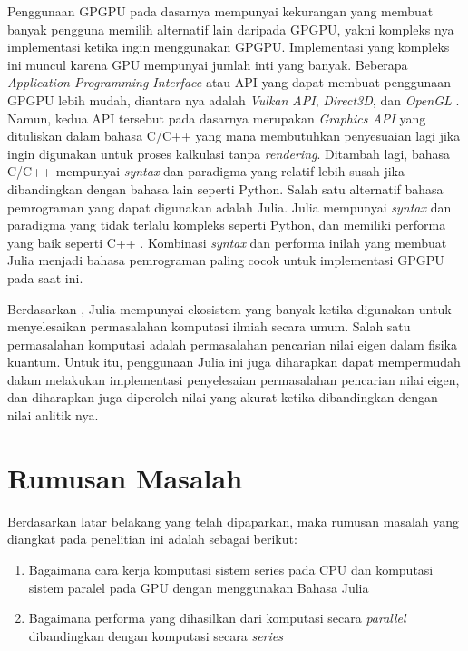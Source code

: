 
Penggunaan GPGPU pada dasarnya mempunyai kekurangan yang membuat banyak
pengguna memilih alternatif lain daripada GPGPU, yakni kompleks nya
implementasi ketika ingin menggunakan GPGPU. Implementasi yang kompleks ini
muncul karena GPU mempunyai jumlah inti yang banyak. Beberapa \emph{Application
	Programming Interface} atau API \citep{evansonExplainerWhatAPI2021} yang dapat
membuat penggunaan GPGPU lebih mudah, diantara nya adalah \emph{Vulkan API},
\emph{Direct3D}, dan \emph{OpenGL}
\citep{khairySurveyArchitecturalApproaches2019}. Namun, kedua API tersebut pada
dasarnya merupakan \emph{Graphics API} yang dituliskan dalam bahasa C/C++ yang
mana membutuhkan penyesuaian lagi jika ingin digunakan untuk proses kalkulasi
tanpa \emph{rendering}. Ditambah lagi, bahasa C/C++ mempunyai \emph{syntax} dan
paradigma yang relatif lebih susah jika dibandingkan dengan bahasa lain seperti
Python. Salah satu alternatif bahasa pemrograman yang dapat digunakan adalah
Julia. Julia mempunyai \emph{syntax} dan paradigma yang tidak terlalu kompleks seperti
Python, dan memiliki performa yang baik seperti C++
\cite{bezansonJuliaMicroBenchmarks2023}. Kombinasi \emph{syntax} dan performa inilah
yang membuat Julia menjadi bahasa pemrograman paling cocok untuk implementasi
GPGPU pada saat ini.

Berdasarkan \cite{jeffbezansonJuliaProgrammingLanguage2024}, Julia mempunyai ekosistem yang banyak ketika digunakan untuk menyelesaikan permasalahan komputasi ilmiah secara umum. Salah satu permasalahan komputasi adalah permasalahan pencarian nilai eigen dalam fisika kuantum. Untuk itu, penggunaan Julia ini juga diharapkan dapat mempermudah dalam melakukan implementasi penyelesaian permasalahan pencarian nilai eigen, dan diharapkan juga diperoleh nilai yang akurat ketika dibandingkan dengan nilai anlitik nya.

\section{Rumusan Masalah}
Berdasarkan latar belakang yang telah dipaparkan, maka rumusan masalah yang
diangkat pada penelitian ini adalah sebagai berikut:
\begin{enumerate}
	\item Bagaimana cara kerja komputasi sistem series pada CPU dan komputasi sistem paralel pada GPU dengan menggunakan
	      Bahasa Julia

	\item Bagaimana performa yang dihasilkan dari komputasi secara \emph{parallel}
	      dibandingkan dengan komputasi secara \emph{series}
\end{enumerate}

